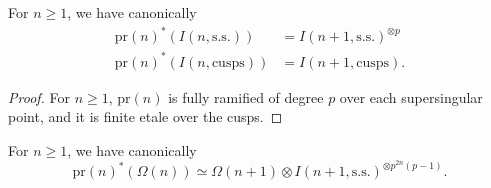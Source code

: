 \begin{klem}\label{lem:12.9.2}
For $n \ge 1$, we have canonically
\begin{align*}
\mathrm{pr}(n)^*(I(n, \mathrm{s.s.})) &= I(n+1, \mathrm{s.s.})^{\otimes p} \\
\mathrm{pr}(n)^*(I(n, \mathrm{cusps})) &= I(n+1, \mathrm{cusps}) .
\end{align*}
\end{klem}

\begin{proof}
For $n \ge 1$, $\mathrm{pr}(n)$ is fully ramified of degree $p$ over each supersingular point, and it is finite etale over the cusps.
\end{proof}

\begin{klem}\label{lem:12.9.3}
For $n \ge 1$, we have canonically
\[
\mathrm{pr}(n)^*(\Omega(n)) \simeq \Omega(n+1) \otimes I(n+1, \mathrm{s.s.})^{\otimes p^{2n}(p-1)} .
\]
\end{klem}

